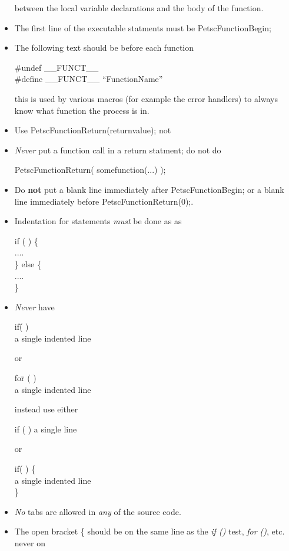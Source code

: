 \documentclass[twoside,12pt]{../sty/report_petsc}
\begin{document}
\begin{itemize}
      between the local variable declarations and the body of the function.
\item The first line of the executable statments must be PetscFunctionBegin;
\item The following text should be before each function
\begin{tabbing}
\#undef \_\_FUNCT\_\_\\
\#define \_\_FUNCT\_\_ ``FunctionName''
\end{tabbing}
this is used by various macros (for example the error handlers) to always know
what function the process is in.
\item Use PetscFunctionReturn(returnvalue); not 
\item {\em Never} put a function call in a return statment; do not do
\begin{tabbing}
   PetscFunctionReturn( somefunction(...) );
\end{tabbing}
\item Do {\bf not} put a blank line immediately after PetscFunctionBegin; or
a blank line immediately before PetscFunctionReturn(0);.
\item Indentation for  statements {\em must}  be done  as
as
\begin{tabbing}
   if (  ) \{\\
     ....\\
   \} else \{\\
     ....\\
   \}
\end{tabbing}
\item {\em Never}  have
\begin{tabbing}
   if\= (  ) \\
     \>a single indented line
\end{tabbing}
or
\begin{tabbing}
   fo\=r (  ) \\
     \>a single indented line
\end{tabbing}
instead use either
\begin{tabbing}
   if (  ) a single line
\end{tabbing}
or
\begin{tabbing}
   if\= (  ) \{\\
     \>a single indented line\\
   \}
\end{tabbing}
\item {\em No} tabs are allowed in {\em any} of the source code.
\item The open bracket \{ should be on the same line as the {\em if ()} test, {\em for ()}, etc. never on

\end{itemize}
\end{document}
